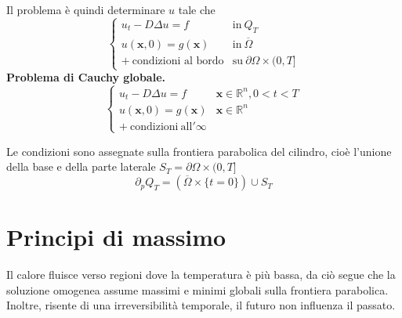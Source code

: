 \documentclass[10pt,a4paper,twoside,openright]{book}
\begin{document}
Il problema è quindi determinare $u$ tale che
\begin{equation*}
\begin{cases}
u_{t} -D\Delta u=f & \text{in} \ Q_{T}\\
u(\mathbf{x},0) =g(\mathbf{x}) & \text{in} \ \overline{\Omega }\\
+\ \text{condizioni al bordo} & \text{su} \ \partial \Omega \times ( 0,T]
\end{cases}
\end{equation*}
\textbf{Problema di Cauchy globale.}
\begin{equation*}
\begin{cases}
u_{t} -D\Delta u=f & \mathbf{x} \in \mathbb{R}^{n},0< t< T\\
u(\mathbf{x},0) =g(\mathbf{x}) & \mathbf{x} \in \mathbb{R}^{n}\\
\mathrm{+\ condizioni\ all'\infty } & 
\end{cases}
\end{equation*}
\begin{definition}
 Le condizioni sono assegnate sulla frontiera parabolica del cilindro, cioè l'unione della base e della parte laterale $S_{T} =\partial \Omega \times ( 0,T]$
\begin{equation*}
\partial _{p} Q_{T} =(\overline{\Omega } \times \{t=0\}) \cup S_{T}
\end{equation*}
\end{definition}
\section{Principi di massimo}

Il calore fluisce verso regioni dove la temperatura è più bassa, da ciò segue che la soluzione omogenea assume massimi e minimi globali sulla frontiera parabolica. Inoltre, risente di una irreversibilità temporale, il futuro non influenza il passato.
\end{document}
